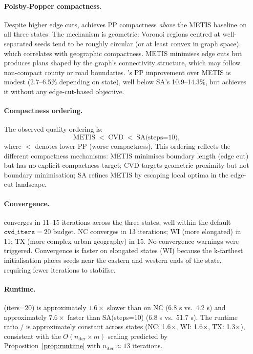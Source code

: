 \paragraph{Polsby-Popper compactness.}
Despite higher edge cuts, \cvd{} achieves PP compactness \emph{above}
the METIS baseline on all three states.
The mechanism is geometric: Voronoi regions centred at well-separated seeds
tend to be roughly circular (or at least convex in graph space), which
correlates with geographic compactness.
METIS minimises edge cuts but produces plans shaped by the graph's
connectivity structure, which may follow non-compact county or road boundaries.
\cvd{}'s PP improvement over METIS is modest (2.7--6.5\% depending on state),
well below SA's 10.9--14.3\%, but \cvd{} achieves it without any
edge-cut-based objective.

\paragraph{Compactness ordering.}
The observed quality ordering is:
\[
  \text{METIS} \;<\; \text{CVD} \;<\; \text{SA(steps=10)},
\]
where $<$ denotes lower PP (worse compactness).
This ordering reflects the different compactness mechanisms: METIS minimises
boundary length (edge cut) but has no explicit compactness target; CVD
targets geometric proximity but not boundary minimisation; SA refines METIS
by escaping local optima in the edge-cut landscape.

\paragraph{Convergence.}
\cvd{} converges in 11--15 iterations across the three states, well within the
default $\mathtt{cvd\_iters} = 20$ budget.
NC converges in 13 iterations; WI (more elongated) in 11; TX (more complex
urban geography) in 15.
No convergence warnings were triggered.
Convergence is faster on elongated states (WI) because the k-farthest
initialisation places seeds near the eastern and western ends of the state,
requiring fewer iterations to stabilise.

\paragraph{Runtime.}
\cvd{}(iters=20) is approximately $1.6\times$ slower than \metis{} on NC
(6.8 s vs.\ 4.2 s) and approximately $7.6\times$ faster than SA(steps=10)
(6.8 s vs.\ 51.7 s).
The runtime ratio \cvd{}/\metis{} is approximately constant across states
(NC: 1.6$\times$, WI: 1.6$\times$, TX: 1.3$\times$), consistent with
the $O(n_{\mathrm{iter}} \times m)$ scaling predicted by
Proposition~\ref{prop:runtime} with $n_{\mathrm{iter}} \approx 13$ iterations.

